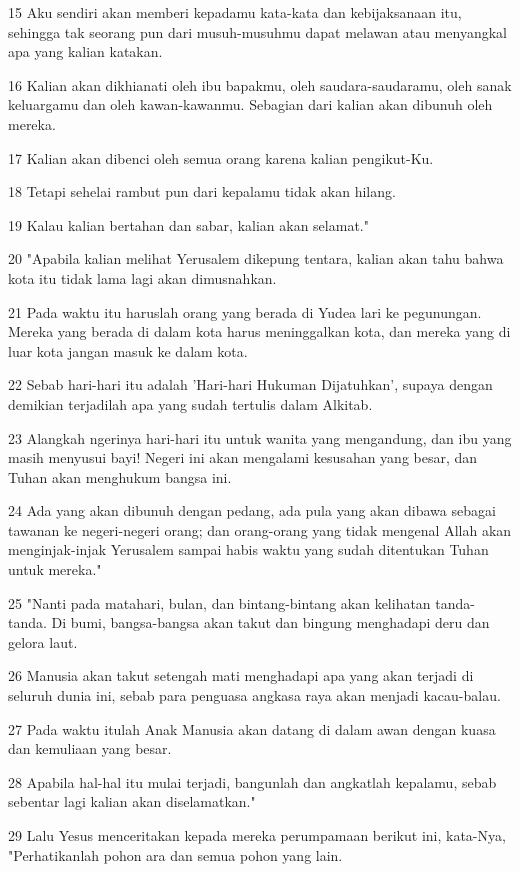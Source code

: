 \par 15 Aku sendiri akan memberi kepadamu kata-kata dan kebijaksanaan itu, sehingga tak seorang pun dari musuh-musuhmu dapat melawan atau menyangkal apa yang kalian katakan.
\par 16 Kalian akan dikhianati oleh ibu bapakmu, oleh saudara-saudaramu, oleh sanak keluargamu dan oleh kawan-kawanmu. Sebagian dari kalian akan dibunuh oleh mereka.
\par 17 Kalian akan dibenci oleh semua orang karena kalian pengikut-Ku.
\par 18 Tetapi sehelai rambut pun dari kepalamu tidak akan hilang.
\par 19 Kalau kalian bertahan dan sabar, kalian akan selamat."
\par 20 "Apabila kalian melihat Yerusalem dikepung tentara, kalian akan tahu bahwa kota itu tidak lama lagi akan dimusnahkan.
\par 21 Pada waktu itu haruslah orang yang berada di Yudea lari ke pegunungan. Mereka yang berada di dalam kota harus meninggalkan kota, dan mereka yang di luar kota jangan masuk ke dalam kota.
\par 22 Sebab hari-hari itu adalah 'Hari-hari Hukuman Dijatuhkan', supaya dengan demikian terjadilah apa yang sudah tertulis dalam Alkitab.
\par 23 Alangkah ngerinya hari-hari itu untuk wanita yang mengandung, dan ibu yang masih menyusui bayi! Negeri ini akan mengalami kesusahan yang besar, dan Tuhan akan menghukum bangsa ini.
\par 24 Ada yang akan dibunuh dengan pedang, ada pula yang akan dibawa sebagai tawanan ke negeri-negeri orang; dan orang-orang yang tidak mengenal Allah akan menginjak-injak Yerusalem sampai habis waktu yang sudah ditentukan Tuhan untuk mereka."
\par 25 "Nanti pada matahari, bulan, dan bintang-bintang akan kelihatan tanda-tanda. Di bumi, bangsa-bangsa akan takut dan bingung menghadapi deru dan gelora laut.
\par 26 Manusia akan takut setengah mati menghadapi apa yang akan terjadi di seluruh dunia ini, sebab para penguasa angkasa raya akan menjadi kacau-balau.
\par 27 Pada waktu itulah Anak Manusia akan datang di dalam awan dengan kuasa dan kemuliaan yang besar.
\par 28 Apabila hal-hal itu mulai terjadi, bangunlah dan angkatlah kepalamu, sebab sebentar lagi kalian akan diselamatkan."
\par 29 Lalu Yesus menceritakan kepada mereka perumpamaan berikut ini, kata-Nya, "Perhatikanlah pohon ara dan semua pohon yang lain.
